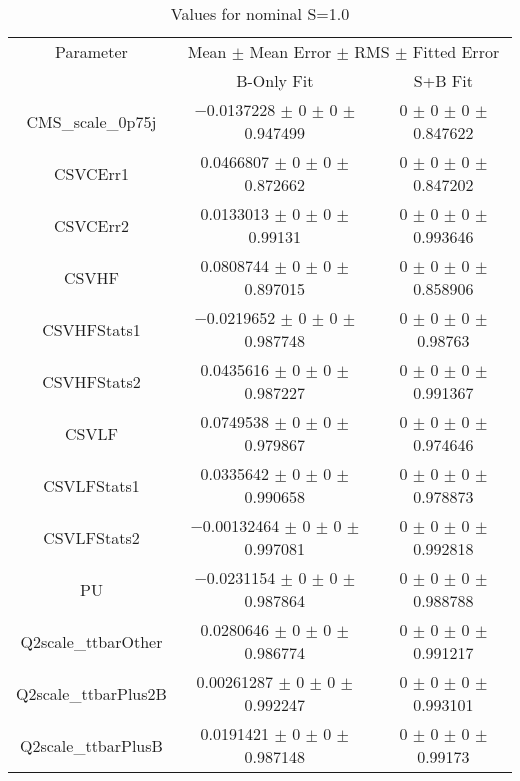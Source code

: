 \begin{table}
\centering
\caption{Values for nominal S=1.0}
\begin{tabular}{ccc}
\toprule
Parameter & \multicolumn{2}{c}{Mean $\pm$ Mean Error $\pm$ RMS $\pm$ Fitted Error}\\
 & B-Only Fit & S+B Fit\\
\midrule
CMS\_scale\_0p75j & \num{-0.0137228} $\pm$ \num{0} $\pm$ \num{0} $\pm$ \num{0.947499} & \num{0} $\pm$ \num{0} $\pm$ \num{0} $\pm$ \num{0.847622}\\
CSVCErr1 & \num{0.0466807} $\pm$ \num{0} $\pm$ \num{0} $\pm$ \num{0.872662} & \num{0} $\pm$ \num{0} $\pm$ \num{0} $\pm$ \num{0.847202}\\
CSVCErr2 & \num{0.0133013} $\pm$ \num{0} $\pm$ \num{0} $\pm$ \num{0.99131} & \num{0} $\pm$ \num{0} $\pm$ \num{0} $\pm$ \num{0.993646}\\
CSVHF & \num{0.0808744} $\pm$ \num{0} $\pm$ \num{0} $\pm$ \num{0.897015} & \num{0} $\pm$ \num{0} $\pm$ \num{0} $\pm$ \num{0.858906}\\
CSVHFStats1 & \num{-0.0219652} $\pm$ \num{0} $\pm$ \num{0} $\pm$ \num{0.987748} & \num{0} $\pm$ \num{0} $\pm$ \num{0} $\pm$ \num{0.98763}\\
CSVHFStats2 & \num{0.0435616} $\pm$ \num{0} $\pm$ \num{0} $\pm$ \num{0.987227} & \num{0} $\pm$ \num{0} $\pm$ \num{0} $\pm$ \num{0.991367}\\
CSVLF & \num{0.0749538} $\pm$ \num{0} $\pm$ \num{0} $\pm$ \num{0.979867} & \num{0} $\pm$ \num{0} $\pm$ \num{0} $\pm$ \num{0.974646}\\
CSVLFStats1 & \num{0.0335642} $\pm$ \num{0} $\pm$ \num{0} $\pm$ \num{0.990658} & \num{0} $\pm$ \num{0} $\pm$ \num{0} $\pm$ \num{0.978873}\\
CSVLFStats2 & \num{-0.00132464} $\pm$ \num{0} $\pm$ \num{0} $\pm$ \num{0.997081} & \num{0} $\pm$ \num{0} $\pm$ \num{0} $\pm$ \num{0.992818}\\
PU & \num{-0.0231154} $\pm$ \num{0} $\pm$ \num{0} $\pm$ \num{0.987864} & \num{0} $\pm$ \num{0} $\pm$ \num{0} $\pm$ \num{0.988788}\\
Q2scale\_ttbarOther & \num{0.0280646} $\pm$ \num{0} $\pm$ \num{0} $\pm$ \num{0.986774} & \num{0} $\pm$ \num{0} $\pm$ \num{0} $\pm$ \num{0.991217}\\
Q2scale\_ttbarPlus2B & \num{0.00261287} $\pm$ \num{0} $\pm$ \num{0} $\pm$ \num{0.992247} & \num{0} $\pm$ \num{0} $\pm$ \num{0} $\pm$ \num{0.993101}\\
Q2scale\_ttbarPlusB & \num{0.0191421} $\pm$ \num{0} $\pm$ \num{0} $\pm$ \num{0.987148} & \num{0} $\pm$ \num{0} $\pm$ \num{0} $\pm$ \num{0.99173}\\

\end{tabular}
\end{table}
